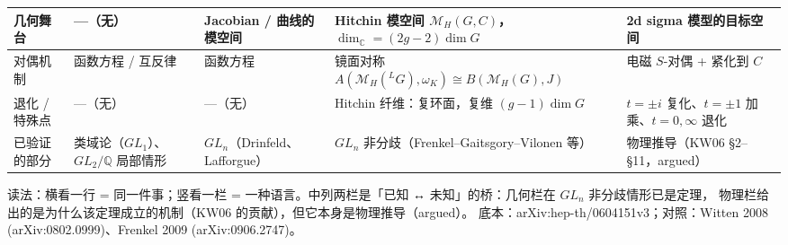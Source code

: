 \documentclass[9pt]{article}
\begin{document}
\begin{longtable}{@{}p{2.5cm}p{4.5cm}p{5.3cm}p{5.3cm}p{4.6cm}@{}}
\midrule
几何舞台
& —（无）
& Jacobian / 曲线的模空间
& Hitchin 模空间 $\mathcal M_H(G,C)$，$\dim_{\mathbb C}=(2g-2)\dim G$
& 2d sigma 模型的目标空间 \\
\midrule
对偶机制
& 函数方程 / 互反律
& 函数方程
& 镜面对称 $A(\mathcal M_H({}^{L}G),\omega_K)\cong B(\mathcal M_H(G),J)$
& 电磁 $S$-对偶 + 紧化到 $C$ \\
\midrule
退化 / 特殊点
& —（无）
& —（无）
& Hitchin 纤维：复环面，复维 $(g-1)\dim G$
& $t=\pm i$ 复化、$t=\pm1$ 加乘、$t=0,\infty$ 退化 \\
\midrule
已验证的部分
& 类域论（$GL_1$）、$GL_2/\mathbb Q$ 局部情形
& $GL_n$（Drinfeld、Lafforgue）
& $GL_n$ 非分歧（Frenkel--Gaitsgory--Vilonen 等）
& 物理推导（KW06 §2--§11，argued） \\
\bottomrule
\end{longtable}
\endgroup

\vspace{4pt}
{\scriptsize\color{gcol}
读法：横看一行 = 同一件事；竖看一栏 = 一种语言。中列两栏是「已知 ↔ 未知」的桥：几何栏在 $GL_n$ 非分歧情形已是定理，
物理栏给出的是为什么该定理成立的机制（KW06 的贡献），但它本身是物理推导（argued）。
底本：arXiv:hep-th/0604151v3；对照：Witten 2008 (arXiv:0802.0999)、Frenkel 2009 (arXiv:0906.2747)。}
\end{document}
